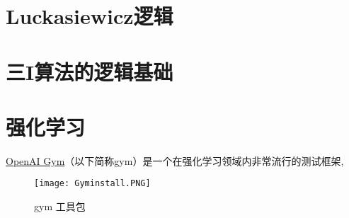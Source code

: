 \section{Luckasiewicz逻辑}
\section{三I算法的逻辑基础}
\section{强化学习}
\href{https://gym.openai.com/}{OpenAI Gym}（以下简称gym）是一个在强化学习领域内非常流行的测试框架,
\begin{figure}[H]
\centering
\texttt{[image: Gyminstall.PNG]}
\caption{gym 工具包}
\label{Gyminstall}
\end{figure}

